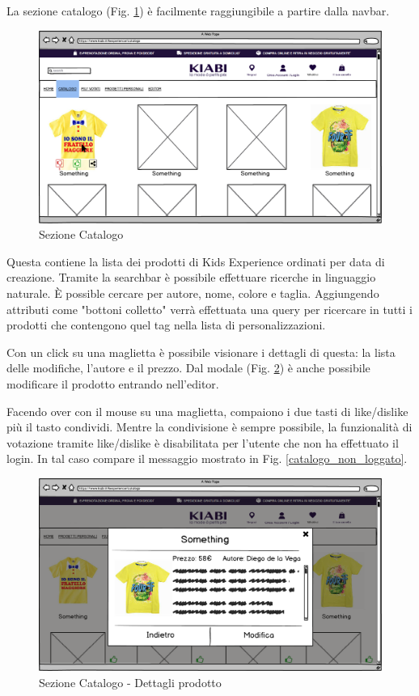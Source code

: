 \documentclass[12pt,italian,]{report}
\begin{document}
La sezione catalogo (Fig. \ref{catalogo}) è facilmente raggiungibile a partire dalla navbar.

\begin{figure}[h]
\centering
\includegraphics{../../balsamiq/balsamiq_finale/Catalogo.png}
\caption{Sezione Catalogo}
\label{catalogo}
\end{figure}

Questa contiene la lista dei prodotti di Kids Experience ordinati per data di creazione. Tramite la searchbar è possibile effettuare ricerche in linguaggio naturale. È possible cercare per autore, nome, colore e taglia. Aggiungendo attributi come "bottoni colletto" verrà effettuata una query per ricercare in tutti i prodotti che contengono quel tag nella lista di personalizzazioni.

Con un click su una maglietta è possibile visionare i dettagli di questa: la lista delle modifiche, l'autore e il prezzo. Dal modale (Fig. \ref{catalogo_dettagli}) è anche possibile modificare il prodotto entrando nell'editor.

Facendo over con il mouse su una maglietta, compaiono i due tasti di like/dislike più il tasto condividi. Mentre la condivisione è sempre possibile, la funzionalità di votazione tramite like/dislike è disabilitata per l'utente che non ha effettuato il login. In tal caso compare il messaggio mostrato in Fig. \ref{catalogo_non_loggato}.

\begin{figure}[h]
\centering
\includegraphics{../../balsamiq/balsamiq_finale/Catalogodetails.png}
\caption{Sezione Catalogo - Dettagli prodotto}
\label{catalogo_dettagli}
\end{figure}
\end{document}
